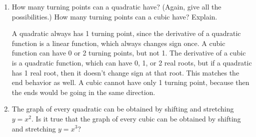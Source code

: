 \documentclass{article}
\begin{document}
\begin{enumerate}[resume, topsep=0pt]
\begin{enumerate}
    \begin{solution}
      A quadratic can have 0, 1, or 2 real roots. A cubic can have
      1, 2, or 3 real roots. A cubic cannot have 0 real roots. Due to
      its end behavior, a cubic must cross the $x$-axis at least once.
    \end{solution}

  \item


    \begin{problem}[\vfill]
      How many turning points can a quadratic have? (Again, give all the possibilities.) How many turning points can a cubic have? Explain.
    \end{problem}

    \begin{solution}
      A quadratic always has 1 turning point, since the derivative
      of a quadratic function is a linear function, which always
      changes sign once. A cubic function can have 0 or 2 turning points,
      but not 1. The derivative of a cubic is a quadratic function,
      which can have 0, 1, or 2 real roots, but if a quadratic has 1 real
      root, then it doesn't change sign at that root. This matches
      the end behavior as well. A cubic cannot have only 1 turning point,
      because then the ends would be going in the same direction.
    \end{solution}

  \item


    \begin{problem}[\nstretch{0.25}]
      The graph of every quadratic can be obtained by shifting and stretching $y = x^2$. Is it true that the graph of every cubic can be obtained by shifting and stretching $y = x^3$? 
    \end{problem}


\end{enumerate}
\end{enumerate}
\end{document}
